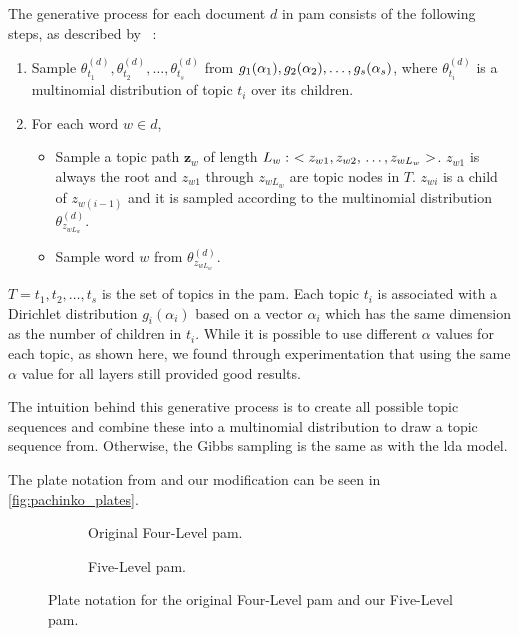 The generative process for each document $d$ in \gls{pam} consists of the following steps, as described by \citeauthor{li2006pachinko}~\cite{li2006pachinko}:
\begin{enumerate}
	\item Sample $\theta_{t_1}^{(d)}, \theta_{t_2}^{(d)}, \dots, \theta_{t_s}^{(d)}$ from  $g_1(\alpha_1), g_2(\alpha_2), \dots, \newline g_s(\alpha_s)$, where $\theta_{t_i}^{(d)}$ is a multinomial distribution of topic $t_i$ over its children.
	\item For each word $w \in d$,
	\begin{itemize}
		\item Sample a topic path $\mathbf{z}_w$ of length $L_w:~< z_{w1}, z_{w2},\newline \dots, z_{wL_w} >$. $z_{w1}$ is always the root and $z_{w1}$ through $z_{wL_w}$ are topic nodes in $T$. $z_{wi}$ is a child of $z_{w(i-1)}$ and it is sampled according to the multinomial distribution $\theta_{z_{wL_w}}^{(d)}$.
		\item Sample word $w$ from $\theta_{z_{wL_w}}^{(d)}$.
	\end{itemize}
\end{enumerate}

$T = {t_1, t_2, \dots, t_s}$ is the set of topics in the \gls{pam}. 
Each topic $t_i$ is associated with a Dirichlet distribution $g_i(\alpha_i)$ based on a vector $\alpha_i$ which has the same dimension as the number of children in $t_i$.
While it is possible to use different $\alpha$ values for each topic, as shown here, we found through experimentation that using the same $\alpha$ value for all layers still provided good results.

The intuition behind this generative process is to create all possible topic sequences and combine these into a multinomial distribution to draw a topic sequence from.
Otherwise, the Gibbs sampling is the same as with the \gls{lda} model.

The plate notation from \citet{li2006pachinko} and our modification can be seen in \autoref{fig:pachinko_plates}.

\begin{figure*}[ht]
	\centering
	\begin{subfigure}{0.40\textwidth}
		\centering
		\resizebox{\textwidth}{!}{%
			
		}
		\caption{Original Four-Level \gls{pam}.}
		\label{fig:four_layer_pachinko}
	\end{subfigure}
	\hspace{1em}
	\begin{subfigure}{0.40\textwidth}
		\centering
		\resizebox{\textwidth}{!}{%
			
		}
		\caption{Five-Level \gls{pam}.}
		\label{fig:five_layer_pachinko}
	\end{subfigure}
	\caption{Plate notation for the original Four-Level \gls{pam} and our Five-Level \gls{pam}.}
	\label{fig:pachinko_plates}
\end{figure*}
